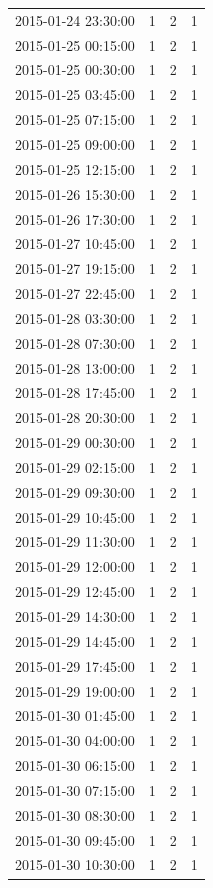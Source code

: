 \begin{tabular}{lrrr}
2015-01-24 23:30:00 & 1 & 2 & 1 \\
2015-01-25 00:15:00 & 1 & 2 & 1 \\
2015-01-25 00:30:00 & 1 & 2 & 1 \\
2015-01-25 03:45:00 & 1 & 2 & 1 \\
2015-01-25 07:15:00 & 1 & 2 & 1 \\
2015-01-25 09:00:00 & 1 & 2 & 1 \\
2015-01-25 12:15:00 & 1 & 2 & 1 \\
2015-01-26 15:30:00 & 1 & 2 & 1 \\
2015-01-26 17:30:00 & 1 & 2 & 1 \\
2015-01-27 10:45:00 & 1 & 2 & 1 \\
2015-01-27 19:15:00 & 1 & 2 & 1 \\
2015-01-27 22:45:00 & 1 & 2 & 1 \\
2015-01-28 03:30:00 & 1 & 2 & 1 \\
2015-01-28 07:30:00 & 1 & 2 & 1 \\
2015-01-28 13:00:00 & 1 & 2 & 1 \\
2015-01-28 17:45:00 & 1 & 2 & 1 \\
2015-01-28 20:30:00 & 1 & 2 & 1 \\
2015-01-29 00:30:00 & 1 & 2 & 1 \\
2015-01-29 02:15:00 & 1 & 2 & 1 \\
2015-01-29 09:30:00 & 1 & 2 & 1 \\
2015-01-29 10:45:00 & 1 & 2 & 1 \\
2015-01-29 11:30:00 & 1 & 2 & 1 \\
2015-01-29 12:00:00 & 1 & 2 & 1 \\
2015-01-29 12:45:00 & 1 & 2 & 1 \\
2015-01-29 14:30:00 & 1 & 2 & 1 \\
2015-01-29 14:45:00 & 1 & 2 & 1 \\
2015-01-29 17:45:00 & 1 & 2 & 1 \\
2015-01-29 19:00:00 & 1 & 2 & 1 \\
2015-01-30 01:45:00 & 1 & 2 & 1 \\
2015-01-30 04:00:00 & 1 & 2 & 1 \\
2015-01-30 06:15:00 & 1 & 2 & 1 \\
2015-01-30 07:15:00 & 1 & 2 & 1 \\
2015-01-30 08:30:00 & 1 & 2 & 1 \\
2015-01-30 09:45:00 & 1 & 2 & 1 \\
2015-01-30 10:30:00 & 1 & 2 & 1 \\

\end{tabular}
